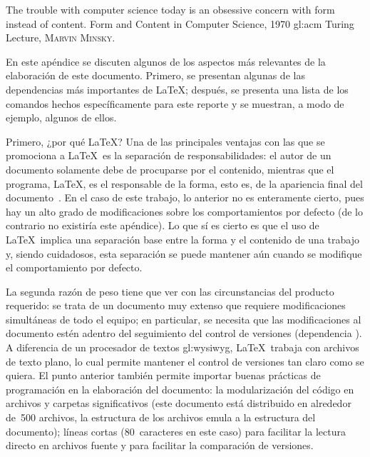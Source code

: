 %
%

{
  \epigrafe
  {%
    The trouble with computer science today is an obsessive concern with
    form instead of content.%
  }
  {%
    Form and Content in Computer Science, 1970 \acrshort{gl:acm} Turing Lecture,
    \textsc{Marvin Minsky}.%
  }
}

\noindent
En este apéndice se discuten algunos de los aspectos más relevantes de la
elaboración de este documento. Primero, se presentan algunas de las dependencias
más importantes de \LaTeX; después, se presenta una lista de los comandos hechos
específicamente para este reporte y se muestran, a modo de ejemplo, algunos de
ellos.

Primero, ¿por qué \LaTeX? Una de las principales ventajas con las que se
promociona a \LaTeX~es la separación de responsabilidades: el autor de un
documento solamente debe de procuparse por el contenido, mientras que el
programa, \LaTeX, es el responsable de la forma, esto es, de la apariencia
final del documento~\cite{introduccion_latex}. En el caso de este trabajo, lo
anterior no es enteramente cierto, pues hay un alto grado de modificaciones
sobre los comportamientos por defecto (de lo contrario no existiría este
apéndice). Lo que sí es cierto es que el uso de \LaTeX~implica una separación
base entre la forma y el contenido de una trabajo y, siendo cuidadosos, esta
separación se puede mantener aún cuando se modifique el comportamiento por
defecto.

La segunda razón de peso tiene que ver con las circunstancias del producto
requerido: se trata de un documento muy extenso que requiere modificaciones
simultáneas de todo el equipo; en particular, se necesita que las
modificaciones al documento estén adentro del seguimiento del control de
versiones (dependencia ). A diferencia de un procesador
de textos \gls{gl:wysiwyg}, \LaTeX~trabaja con archivos de texto plano, lo cual
permite mantener el control de versiones tan claro como se quiera. El punto
anterior también permite importar buenas prácticas de programación en la
elaboración del documento: la modularización del código en archivos y carpetas
significativos (este documento está distribuido en alrededor de~500 archivos,
la estructura de los archivos emula a la estructura del documento); líneas
cortas (80~caracteres en este caso) para facilitar la lectura directo en
archivos fuente y para facilitar la comparación de versiones.

